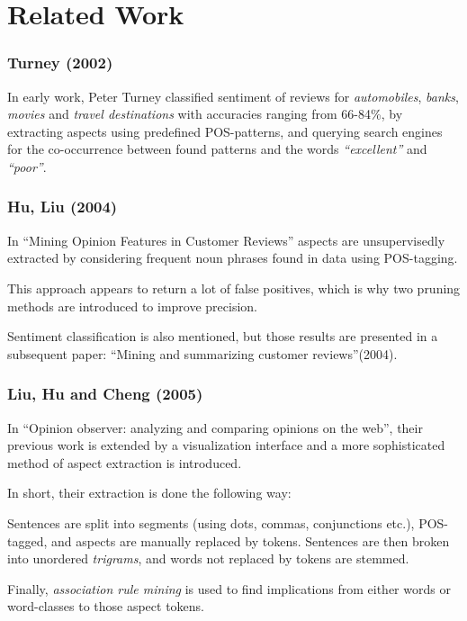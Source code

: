 \documentclass[a4paper,11pt]{kth-mag}
\begin{document}
\section{Related Work}

\subsubsection{Turney (2002)}
In early work, Peter Turney classified sentiment of reviews for \emph{automobiles}, \emph{banks}, \emph{movies} and \emph{travel destinations} with accuracies ranging from 66-84\%, by extracting aspects using predefined POS-patterns, and querying search engines for the co-occurrence between found patterns and the words \emph{``excellent''} and \emph{``poor''}.

\subsubsection{Hu, Liu (2004)}
In ``Mining Opinion Features in Customer Reviews'' aspects are unsupervisedly
extracted by considering frequent noun phrases found in data using POS-tagging.

This approach appears to return a lot of false positives, which is why two pruning
methods are introduced to improve precision.

Sentiment classification is also mentioned, but those results are presented in a subsequent paper:
``Mining and summarizing customer reviews''(2004).


\subsubsection{Liu, Hu and Cheng (2005)}
In ``Opinion observer: analyzing and comparing opinions on the web'', their previous work is extended
by a visualization interface and a more sophisticated method of aspect extraction is introduced.

In short, their extraction is done the following way:

Sentences are split into segments (using dots, commas, conjunctions etc.), POS-tagged, and aspects are
manually replaced by tokens. Sentences are then broken into unordered \emph{trigrams},
and words not replaced by tokens are stemmed.

Finally, \emph{association rule mining}\cite{ma1998integrating} is used to find implications
from either words or word-classes to those aspect tokens.

%
\end{document}
